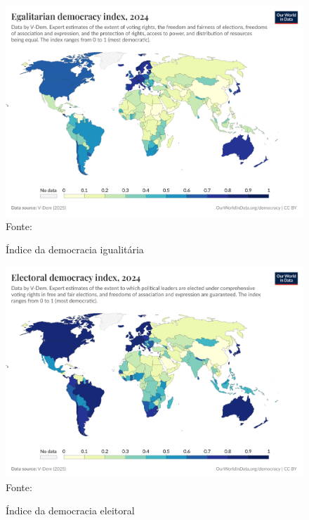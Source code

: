 \begin{figure}[ht]
    \centering
    \caption{Índice da democracia igualitária}
    \includegraphics[width=1\linewidth]{figuras/democracia/egalitarian-democracy-index-vdem.png}
    \label{fig:egalitarian-democracy-index-vdem}
    \footnotesize{Fonte: \cite{egalitarian_democracy_index_vdem}}
\end{figure}

\begin{figure}[ht]
    \centering
    \caption{Índice da democracia eleitoral}
    \includegraphics[width=1\linewidth]{figuras/democracia/electoral-democracy-index.png}
    \label{fig:electoral-democracy-index}
    \footnotesize{Fonte: \cite{electoral_democracy_index}}
\end{figure}

